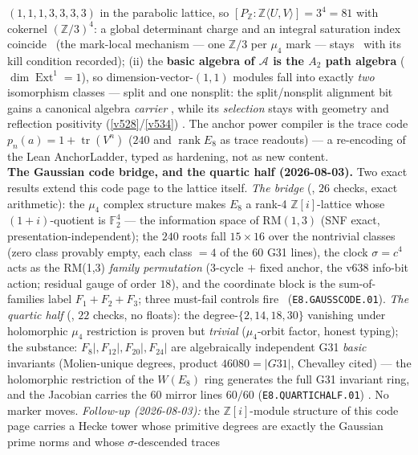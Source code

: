 \documentclass[11pt,a4paper]{article}
\newcommand{\Z}{\mathbb{Z}}
\theoremstyle{definition}
\begin{document}
\begin{winbox}
$(1,1,1,3,3,3,3)$ in the parabolic lattice, so $[P_{\Z}:\Z\langle U,V\rangle]=3^4=81$ with cokernel
$(\Z/3)^4$: a global determinant charge and an integral saturation index coincide \mE\ (the
mark-local mechanism --- one $\Z/3$ per $\mu_4$ mark --- stays \mO\ with its kill condition
recorded); (ii) the \textbf{basic algebra of $\mathcal A$ is the $A_2$ path algebra}
($\dim\operatorname{Ext}^1=1$), so dimension-vector-$(1,1)$ modules fall into exactly \emph{two}
isomorphism classes --- split and one nonsplit: the split/nonsplit alignment bit gains a canonical
algebra \emph{carrier} \mE, while its \emph{selection} stays with geometry and reflection positivity
(\vref{v528}/\vref{v534}) \mC.  The anchor power compiler is the trace code $p_n(a)=1+
\operatorname{tr}(V^n)$ ($240$ and $\operatorname{rank}E_8$ as trace readouts) --- a re-encoding of
the Lean AnchorLadder, typed as hardening, not as new content.
\smallskip\\
\noindent\textbf{The Gaussian code bridge, and the quartic half (2026-08-03).}
Two exact results extend this code page to the lattice itself.
\emph{The bridge} (, $26$ checks,
exact arithmetic): the $\mu_4$ complex structure makes $E_8$ a rank-4
$\Z[i]$-lattice whose $(1+i)$-quotient is $\mathbb F_2^4$ --- the
information space of $\mathrm{RM}(1,3)$ (SNF exact,
presentation-independent); the $240$ roots fall $15\times16$ over the
nontrivial classes (zero class provably empty, each class $=4$ of the
$60$ G31 lines), the clock $\sigma=c^4$ acts as the RM(1,3)
\emph{family permutation} (3-cycle $+$ fixed anchor, the v638
info-bit action; residual gauge of order $18$), and the coordinate
block is the sum-of-families label $F_1{+}F_2{+}F_3$; three
must-fail controls fire \mE\ (\texttt{E8.GAUSSCODE.01}).  \emph{The
quartic half} (, $22$ checks, no
floats): the degree-$\{2,14,18,30\}$ vanishing under holomorphic
$\mu_4$ restriction is proven but \emph{trivial} ($\mu_4$-orbit
factor, honest typing); the substance: $F_8|,F_{12}|,F_{20}|,F_{24}|$
are algebraically independent G31 \emph{basic} invariants (Molien-unique
degrees, product $46080=|G31|$, Chevalley cited) --- the holomorphic
restriction of the $W(E_8)$ ring generates the full G31 invariant
ring, and the Jacobian carries the $60$ mirror lines $60/60$
(\texttt{E8.QUARTICHALF.01}) \mE.  No marker moves.
\emph{Follow-up (2026-08-03):} the $\Z[i]$-module structure of this
code page carries a Hecke tower whose primitive degrees are exactly
the Gaussian prime norms and whose $\sigma$-descended traces

\end{winbox}
\end{document}
